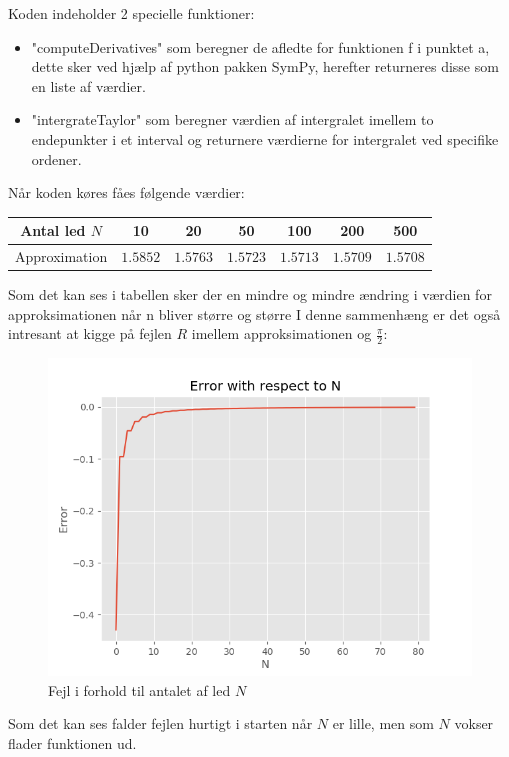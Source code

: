 
Koden indeholder 2 specielle funktioner:
\begin{itemize}
  \item "computeDerivatives" som beregner de afledte for funktionen f 
  i punktet a, dette sker ved hjælp af python pakken SymPy, herefter returneres disse som en liste af værdier.  
  \item "intergrateTaylor" som beregner værdien af intergralet imellem to endepunkter i et interval
  og returnere værdierne for intergralet ved specifike ordener. 
\end{itemize} 
Når koden køres fåes følgende værdier:
\begin{center}
  \begin{tabular}{ |c|c|c|c|c|c|c| }
    \hline
      Antal led $N$ & 10 & 20 & 50 & 100 & 200 & 500 \\
    \hline
      Approximation & $1.5852$ & $1.5763$ & $1.5723$ & $1.5713$ & $1.5709$ & $1.5708$ \\
    \hline
  \end{tabular}
\end{center}
Som det kan ses i tabellen sker der en mindre og mindre ændring i værdien for approksimationen når n bliver større og større
I denne sammenhæng er det også intresant at kigge på fejlen $R$ imellem approksimationen og $\frac{\pi}{2}$:
\begin{figure}[H]
  \centering
  \includegraphics[width=\textwidth]{fig/img/ErrorWithRespectToN.png}
  \caption{Fejl i forhold til antalet af led $N$}
  \label{fig:FejlIForholdTilN}
\end{figure}
Som det kan ses falder fejlen hurtigt i starten når $N$ er lille, men som $N$ vokser flader funktionen ud.
